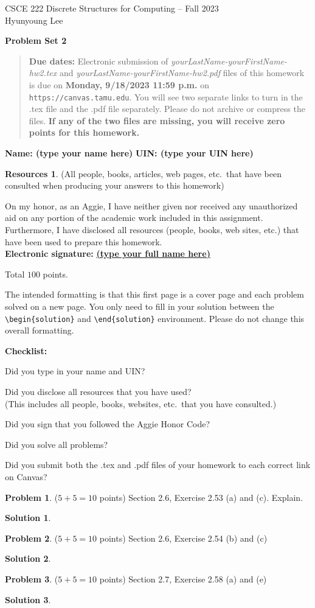 \documentclass{article}
\theoremstyle{definition}
\newtheorem{problem}{Problem}
\newtheorem*{solution}{Solution}
\newtheorem*{resources}{Resources}
\newcommand{\name}[2]{\noindent\textbf{Name: #1}\hfill \textbf{UIN: #2}
  \newcommand{\myName}{#1}
  \newcommand{\myUIN}{#2}
}
\newcommand{\honor}{\noindent On my honor, as an Aggie, I have neither
  given nor received any unauthorized aid on any portion of the
  academic work included in this assignment. Furthermore, I have
  disclosed all resources (people, books, web sites, etc.) that have
  been used to prepare this homework. \\[2ex]
 \textbf{Electronic signature:} \underline{ \textbf{(type your full name here)} } } %
\newcommand{\checklist}{\noindent\textbf{Checklist:}
\begin{compactitem}[$\Box$] 
\item Did you type in your name and UIN? 
\item Did you disclose all resources that you have used? \\
(This includes all people, books, websites, etc.\ that you have consulted.)
\item Did you sign that you followed the Aggie Honor Code? 
\item Did you solve all problems? 
\item Did you submit both the .tex and .pdf files of your homework to each correct link on Canvas? 
\end{compactitem}
}
\newcommand{\problemset}[1]{\begin{center}\textbf{Problem Set #1}\end{center}}
\newcommand{\duedate}[1]{\begin{quote}\textbf{Due dates:} Electronic
    submission of \textsl{yourLastName-yourFirstName-hw2.tex} and 
    \textsl{yourLastName-yourFirstName-hw2.pdf} files of this homework is due on
    \textbf{#1} on \texttt{https://canvas.tamu.edu}. You will see two separate links
    to turn in the .tex file and the .pdf file separately. Please do not archive or compress the files.  
    \textbf{If any of the two files are missing, you will receive zero points for this homework.}\end{quote} }
\begin{document}
\begin{center}
{\large
CSCE 222 Discrete Structures for Computing -- Fall 2023\\[.5ex]
Hyunyoung Lee\\}
\end{center}
\problemset{2}
\duedate{Monday, 9/18/2023 11:59 p.m.}
\name{ (type your name here) }{ (type your UIN here) }  %

\begin{resources} (All people, books, articles, web pages, etc.\ that
  have been consulted when producing your answers to this homework)
\end{resources}
\honor

\bigskip

\noindent
Total $100$ points.

\bigskip

\noindent
The intended formatting is that this first page is a cover page and each 
problem solved on a new page. You only need to fill in your solution between 
the \verb|\begin{solution}| and \verb|\end{solution}| environment.  
Please do not change this overall formatting.

\vfill
\checklist

\newpage
\begin{problem} ($5+5=10$ points) Section 2.6, Exercise 2.53 (a) and (c). Explain.
\end{problem}
\begin{solution} 
\end{solution}

\newpage
\begin{problem} ($5+5=10$ points) Section 2.6, Exercise 2.54 (b) and (c)
\end{problem}
\begin{solution} 
\end{solution}

\newpage
\begin{problem} ($5+5=10$ points) Section 2.7, Exercise 2.58 (a) and (e)
\end{problem}
\begin{solution} 
\end{solution}
\end{document}

